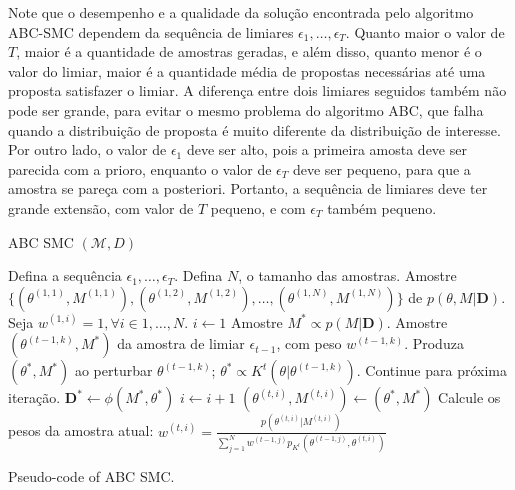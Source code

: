 \documentclass[12pt]{article}
\begin{document}
Note que o desempenho e a qualidade da solução encontrada pelo algoritmo 
ABC-SMC dependem da sequência de limiares $\epsilon_1, \ldots,
\epsilon_T$. Quanto maior o valor de $T$, maior é a quantidade de
amostras geradas, e além disso, quanto menor é o valor do limiar, maior
é a quantidade média de propostas necessárias até uma proposta
satisfazer o limiar. A diferença entre dois limiares seguidos também não
pode ser grande, para evitar o mesmo problema do algoritmo ABC, que
falha quando a distribuição de proposta é muito diferente da
distribuição de interesse. Por outro lado, o valor de $\epsilon_1$ deve
ser alto, pois a primeira amosta deve ser parecida com a prioro, 
enquanto o valor de $\epsilon_T$ deve ser pequeno, para que a amostra se 
pareça com a posteriori. Portanto, a sequência de limiares deve ter 
grande extensão, com valor de $T$ pequeno, e com $\epsilon_T$ também 
pequeno.

\begin{algorithm}[h]
\textsc{ABC SMC} $(\mathcal{M}, D)$
\begin{algorithmic}[1]
    \State Defina a sequência $\epsilon_1, \ldots, \epsilon_T$.
    \State Defina $N$, o tamanho das amostras.
    \State Amostre $\{(\theta^{(1, 1)}, M^{(1, 1)}), 
                     (\theta^{(1, 2)}, M^{(1, 2)}), \ldots, 
                     (\theta^{(1, N)}, M^{(1, N)})\}$ de 
                     $p (\theta, M| \mathbf{D})$.
    \State Seja $w^{(1, i)} = 1, \forall i \in {1, \ldots, N}$.  
        \State $i \gets 1$
            \State Amostre $M^* \propto p (M | \mathbf{D})$.
            \State Amostre $(\theta^{(t - 1, k)}, M^*)$ da amostra de
            limiar $\epsilon_{t-1}$, com peso $w^{(t - 1, k)}$.
            \State Produza $(\theta^*, M^*)$ ao perturbar
                $\theta^{(t - 1, k)}$; 
                $\theta^* \propto K^t(\theta | \theta^{(t - 1, k)})$.
                \State Continue para próxima iteração.
            \EndIf
            \State $\mathbf{D}^* \gets \phi (M^*, \theta^*)$
                \State $i \gets i + 1$
                \State $(\theta^{(t, i)}, M^{(t, i)}) \gets 
                    (\theta^*, M^*)$
            \EndIf
        \EndWhile
        \State Calcule os pesos da amostra atual:
$                w^{(t, i)} = \frac{p (\theta^{(t, i)} | M^{(t, i)})}
                         {\sum_{j = 1}^N w^{(t-1, j)}p_{K^t}
                            (\theta^{(t-1, j)}, \theta^{(t, i)})}$
    \EndFor
    \Return
\end{algorithmic}
\caption{Pseudo-code of ABC SMC.}
\label{code:abc_smc}
\end{algorithm}
\end{document}

